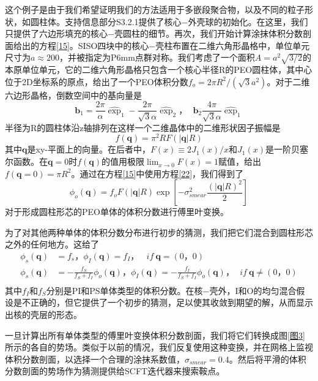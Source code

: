 \documentclass[12pt，a4paper]{article}
\numberwithin{equation}{section}
\begin{document}
这个例子是由于我们希望证明我们的方法适用于多嵌段聚合物，以及不同的粒子形状，如圆柱体。支持信息部分S3.2.1提供了核心−外壳球的初始化。在这里，我们只提供了六边形填充的核心−壳圆柱的细节。再次，我们开始计算涂抹体积分数剖面给出的方程\ref{15}。SISO四块中的核心−壳柱布置在二维六角形晶格中，单位单元尺寸为$a\approx 200$，并被指定为P6mm点群对称。我们考虑了一个面积$A=a^2\sqrt{3/2}$的本原单位单元，它的二维六角形晶格只包含一个核心半径R的PEO圆柱体，其中心位于2D坐标系的原点，给出了一个PEO体积分数$f_o=2\pi R^2/(\sqrt 3a^2)$。对于二维六边形晶格，倒数空间中的基向量是
\begin{equation}\label{21}
\mathbf{b}_1=\frac{2\pi}{\alpha}\hat {\exp}_1-\frac{2\pi}{\sqrt{3}\alpha}\hat{\exp}_2，~~~\mathbf{b}_2\frac{4\pi}{\sqrt{3}\alpha}\hat{\exp}_1
\end{equation}
半径为R的圆柱体沿z轴排列在这样一个二维晶体中的二维形状因子振幅是
\begin{equation}\label{22}
f(\mathbf{q})=\pi ^2 RF(|\mathbf{q}|R)
\end{equation}
其中$\mathbf{q}$是xy-平面上的向量。在后者中，$F(x)\equiv 2J_1(x)/x$和$J_1(x)$是一阶贝塞尔函数。在$\mathbf{q}=0$时$f(\mathbf{q})$的值用极限$\lim _{x\rightarrow 0} F(x)=1$赋值，给出$f(\mathbf{q}=0)=\pi R^2$。通过在方程\ref{15}中使用方程\ref{22}，我们得到了
\begin{equation}\label{23}
\phi _o(\mathbf{q})=f_o F(|\mathbf{q}|R) \exp \left[ -\sigma _{smear}^2 \frac{(|\mathbf{q}|R)^2}{2} \right]
\end{equation}
对于形成圆柱形芯的PEO单体的体积分数进行傅里叶变换。

为了对其他两种单体的体积分数分布进行初步的猜测，我们把它们混合到圆柱形芯之外的任何地方。这给了
\begin{equation}\label{24}
\begin{aligned}
\phi _s(\mathbf{q}) & =f_s，
\phi _I(\mathbf{q})  =f_I，~~~~if~\mathbf{q}=(0，0)\\
\phi _s(\mathbf{q}) & =-\frac{f_S}{f_S+f_I}\phi _o(\mathbf{q})，
\phi _I(\mathbf{q})  =-\frac{f_I}{f_S+f_I}\phi _o(\mathbf{q})，~~~if~\mathbf{q} \neq (0，0)\\
\end{aligned}
\end{equation}
其中$f_I$和$f_S$分别是PI和PS单体类型的体积分数。在核−壳外，I和O的均匀混合假设是不正确的，但它提供了一个初步的猜测，足以使其收敛到期望的解，从而显示出核的壳层的形态。

一旦计算出所有单体类型的傅里叶变换体积分数剖面，我们将它们转换成图\ref{图3}所示的各自的势场。类似于以前的情况，我们反复使用这种变换，并在网格上监视体积分数剖面，以选择一个合理的涂抹系数值，$\sigma _{smear}=0.4$。然后将平滑的体积分数剖面的势场作为猜测提供给SCFT迭代器来搜索鞍点。
\end{document}
